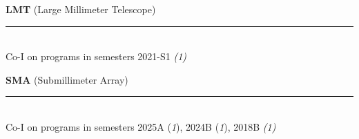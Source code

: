 \documentclass[11pt]{article}
\makeatletter
\def\vhrulefill#1{\leavevmode\leaders\hrule\@height#1\hfill \kern\z@}
\makeatother
\begin{document}

{\bf LMT} {\small (Large Millimeter Telescope)} \vhrulefill{0.5pt}\\
Co-I on programs in semesters 2021-S1 {\em(1)}\medskip


{\bf SMA} {\small (Submillimeter Array)} \vhrulefill{0.5pt}\\
Co-I on programs in semesters 2025A ({\em1}), 2024B ({\em1}), 2018B {\em(1)}\medskip
\end{document}

